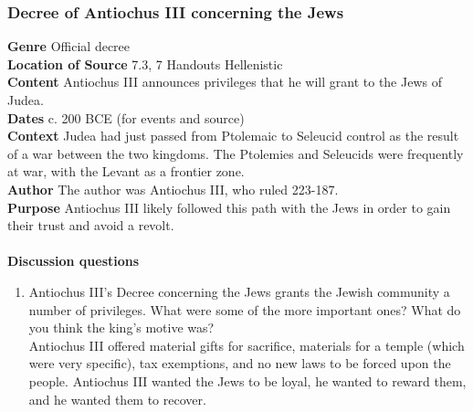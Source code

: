 \documentclass{article}
\begin{document}
\subsubsection*{Decree of Antiochus III concerning the Jews}
\textbf{Genre}
Official decree \\
\textbf{Location of Source}
7.3, 7 Handouts Hellenistic \\
\textbf{Content}
Antiochus III announces privileges that he will grant to the Jews of Judea. \\
\textbf{Dates}
c. 200 BCE (for events and source) \\
\textbf{Context}
Judea had just passed from Ptolemaic to Seleucid control as the result of a war between
the two kingdoms.  The Ptolemies and Seleucids were frequently at war, with the Levant
as a frontier zone. \\
\textbf{Author}
The author was Antiochus III, who ruled 223-187. \\
\textbf{Purpose}
Antiochus III likely followed this path with the Jews in order to gain their trust and avoid a
revolt. \\
\\
\textbf{Discussion questions}
\begin{enumerate}
  \item Antiochus III’s Decree concerning the Jews grants the Jewish community a number
  of privileges. What were some of the more important ones? What do you think the king’s
  motive was? \\
  Antiochus III offered material gifts for sacrifice, materials for a temple (which were very specific),
  tax exemptions, and no new laws to be forced upon the people. Antiochus III wanted the
  Jews to be loyal, he wanted to reward them, and he wanted them to recover.
\end{enumerate}
\end{document}
